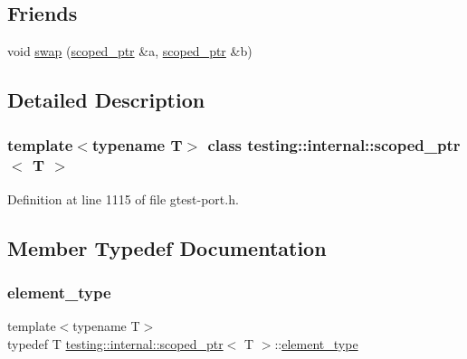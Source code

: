 \subsection*{Friends}
\begin{DoxyCompactItemize}
\item 
void \hyperlink{classtesting_1_1internal_1_1scoped__ptr_a01bc0441e6a3ebf26807ac523392ca86}{swap} (\hyperlink{classtesting_1_1internal_1_1scoped__ptr}{scoped\+\_\+ptr} \&a, \hyperlink{classtesting_1_1internal_1_1scoped__ptr}{scoped\+\_\+ptr} \&b)
\end{DoxyCompactItemize}


\subsection{Detailed Description}
\subsubsection*{template$<$typename T$>$\newline
class testing\+::internal\+::scoped\+\_\+ptr$<$ T $>$}



Definition at line 1115 of file gtest-\/port.\+h.



\subsection{Member Typedef Documentation}
\mbox{\label{classtesting_1_1internal_1_1scoped__ptr_ae755ffeebada8e20b68c1d1ffa91cf13}} 
\subsubsection{\texorpdfstring{element\+\_\+type}{element\_type}}
{\footnotesize\ttfamily template$<$typename T$>$ \\
typedef T \hyperlink{classtesting_1_1internal_1_1scoped__ptr}{testing\+::internal\+::scoped\+\_\+ptr}$<$ T $>$\+::\hyperlink{classtesting_1_1internal_1_1scoped__ptr_ae755ffeebada8e20b68c1d1ffa91cf13}{element\+\_\+type}}



